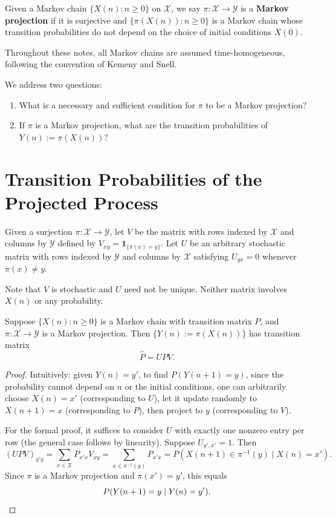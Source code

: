 \documentclass{ximera}
\begin{document}
\begin{definition}
Given a Markov chain $\{X(n) : n \geq 0\}$ on $\mathcal{X}$, we say $\pi : \mathcal{X} \to \mathcal{Y}$ is a \textbf{Markov projection} if it is surjective and $\{\pi(X(n)) : n \geq 0\}$ is a Markov chain whose transition probabilities do not depend on the choice of initial conditions $X(0)$.
\end{definition}

\begin{remark}
Throughout these notes, all Markov chains are assumed time-homogeneous, following the convention of Kemeny and Snell.
\end{remark}

We address two questions:
\begin{enumerate}[label=\arabic*.]
\item What is a necessary and sufficient condition for $\pi$ to be a Markov projection?
\item If $\pi$ is a Markov projection, what are the transition probabilities of $Y(n) := \pi(X(n))$?
\end{enumerate}

\section*{Transition Probabilities of the Projected Process}

\begin{definition}[Notation]
Given a surjection $\pi : \mathcal{X} \to \mathcal{Y}$, let $V$ be the matrix with rows indexed by $\mathcal{X}$ and columns by $\mathcal{Y}$ defined by $V_{xy} = \mathbf{1}_{\{\pi(x) = y\}}$. Let $U$ be an arbitrary stochastic matrix with rows indexed by $\mathcal{Y}$ and columns by $\mathcal{X}$ satisfying $U_{yx} = 0$ whenever $\pi(x) \neq y$.
\end{definition}

Note that $V$ is stochastic and $U$ need not be unique. Neither matrix involves $X(n)$ or any probability.

\begin{theorem}
Suppose $\{X(n) : n \geq 0\}$ is a Markov chain with transition matrix $P$, and $\pi : \mathcal{X} \to \mathcal{Y}$ is a Markov projection. Then $\{Y(n) := \pi(X(n))\}$ has transition matrix
\[
\hat{P} = UPV.
\]
\end{theorem}

\begin{proof}
Intuitively: given $Y(n) = y'$, to find $P(Y(n+1) = y)$, since the probability cannot depend on $n$ or the initial conditions, one can arbitrarily choose $X(n) = x'$ (corresponding to $U$), let it update randomly to $X(n+1) = x$ (corresponding to $P$), then project to $y$ (corresponding to $V$).

For the formal proof, it suffices to consider $U$ with exactly one nonzero entry per row (the general case follows by linearity). Suppose $U_{y',x'} = 1$. Then
\[
(UPV)_{y'y} = \sum_{x \in \mathcal{X}} P_{x'x} V_{xy} = \sum_{x \in \pi^{-1}(y)} P_{x'x} = P(X(n+1) \in \pi^{-1}(y) \mid X(n) = x').
\]
Since $\pi$ is a Markov projection and $\pi(x') = y'$, this equals
\[
P(Y(n+1) = y \mid Y(n) = y'). \qedhere
\]
\end{proof}
\end{document}
